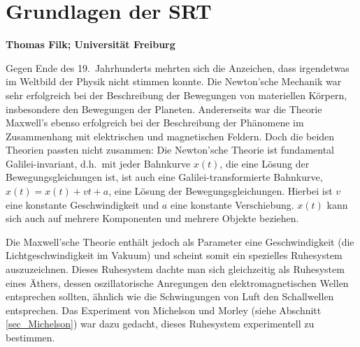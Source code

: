 

\setcounter{page}{1}
\setcounter{section}{0}
\setcounter{figure}{0}
\setcounter{equation}{0}
\setcounter{table}{0}
\setcounter{footnote}{0}

\section*{Grundlagen der SRT}
\noindent
{\bf Thomas Filk; Universit\"at Freiburg}
\vspace{1cm}

\label{chap_Grundlagen}

\noindent
Gegen Ende des 19.\ Jahrhunderts mehrten sich die
Anzeichen, dass irgendetwas im Weltbild der Physik
nicht stimmen konnte. Die Newton'sche Mechanik war
sehr erfolgreich bei der Beschreibung der Bewegungen
von materiellen K\"orpern, insbesondere den Bewegungen der Planeten. Andererseits war die
Theorie Maxwell's ebenso erfolgreich bei der 
Beschreibung der Ph\"anomene im Zusammenhang mit
elektrischen und magnetischen Feldern. Doch die beiden Theorien passten nicht zusammen:
Die Newton'sche Theorie ist fundamental Galilei-invariant, d.h.\ mit jeder Bahnkurve $x(t)$, 
die eine L\"osung der Bewegungsgleichungen ist, ist auch eine Galilei-transformierte Bahnkurve, 
$\hat{x}(t)= x(t)+vt+a$, eine L\"osung der Bewegungsgleichungen. Hierbei ist $v$ eine konstante
Geschwindigkeit und $a$ eine konstante Verschiebung. $x(t)$ kann sich auch auf mehrere Komponenten
und mehrere Objekte beziehen. 
  
Die Maxwell'sche Theorie enth\"alt jedoch als Parameter eine Geschwindigkeit (die 
Lichtgeschwindigkeit im Vakuum) und scheint somit ein
spezielles Ruhesystem auszuzeichnen. Dieses Ruhesystem dachte man sich gleichzeitig als
Ruhesystem eines \"Athers, dessen oszillatorische Anregungen den elektromagnetischen Wellen
entsprechen sollten, \"ahnlich wie die Schwingungen von Luft den Schallwellen entsprechen. Das
Experiment von Michelson und Morley (siehe Abschnitt \ref{sec_Michelson}) war dazu gedacht, 
dieses Ruhesystem experimentell zu bestimmen. 

